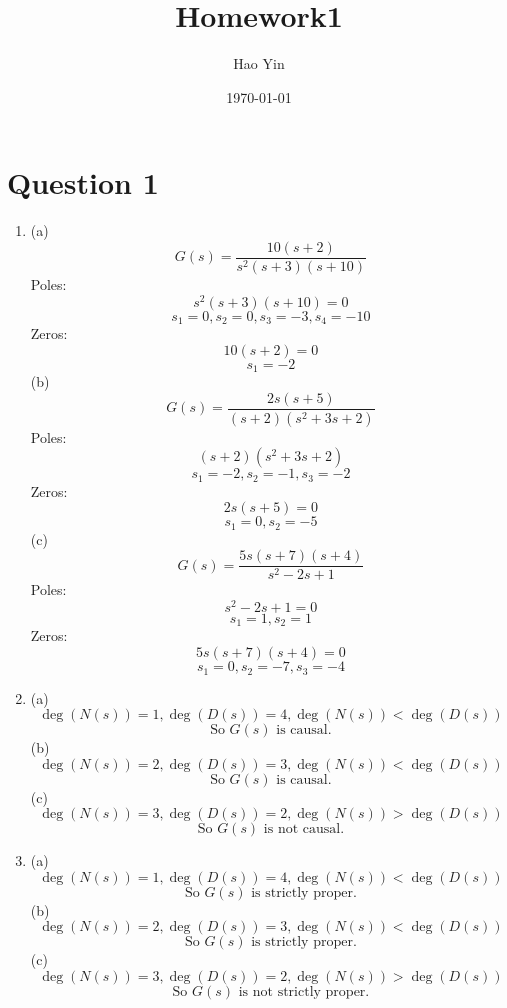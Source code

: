 \documentclass[12pt]{article}
\title{Homework1}
\author{Hao Yin}
\date{\today}
\begin{document}
\maketitle

\section*{Question 1}
\begin{enumerate}[label=\roman*.]
    \item (a)
    \[
    G(s) = \frac{10(s+2)}{s^2(s+3)(s+10)}
    \]
    Poles:
    \[s^2(s+3)(s+10)=0\]
    \[s_1=0,s_2=0,s_3=-3,s_4=-10\]
    Zeros:
    \[10(s+2)=0\]
    \[s_1=-2\]
    (b)
    \[
    G(s) = \frac{2s(s+5)}{(s+2)(s^2+3s+2)}
    \]
    Poles:
    \[(s+2)(s^2+3s+2)\]
    \[s_1=-2,s_2=-1,s_3=-2\]
    Zeros:
    \[2s(s+5)=0\]
    \[s_1=0,s_2=-5\]
    (c)
    \[
    G(s) = \frac{5s(s+7)(s+4)}{s^2-2s+1}
    \]
    Poles:
    \[s^2-2s+1=0\]
    \[s_1=1,s_2=1\]
    Zeros:
    \[5s(s+7)(s+4)=0\]
    \[s_1=0,s_2=-7,s_3=-4\]

    \item (a)
    \[\deg(N(s))=1,\deg(D(s))=4,\deg(N(s))<\deg(D(s))\]
    \[\text{So }G(s)\text{ is causal.}\]
    (b)
    \[\deg(N(s))=2,\deg(D(s))=3,\deg(N(s))<\deg(D(s))\]
    \[\text{So }G(s)\text{ is causal.}\]
    (c)
    \[\deg(N(s))=3,\deg(D(s))=2,\deg(N(s))>\deg(D(s))\]
    \[\text{So }G(s)\text{ is not causal.}\]

    \item (a)
    \[\deg(N(s))=1,\deg(D(s))=4,\deg(N(s))<\deg(D(s))\]
    \[\text{So }G(s)\text{ is strictly proper.}\]
    (b)
    \[\deg(N(s))=2,\deg(D(s))=3,\deg(N(s))<\deg(D(s))\]
    \[\text{So }G(s)\text{ is strictly proper.}\]
    (c)
    \[\deg(N(s))=3,\deg(D(s))=2,\deg(N(s))>\deg(D(s))\]
    \[\text{So }G(s)\text{ is not strictly proper.}\]

\end{enumerate}
\end{document}

